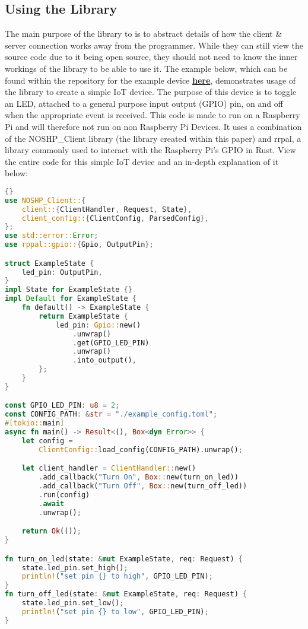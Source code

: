 \subsection{Using the Library}
The main purpose of the library to is to abstract details of how the client \& server connection works away from the programmer. While they can still view the source code due to it being open source, they should not need to know the inner workings of the library to be able to use it. The example below, which can be found within the repository for the example device \textbf{\href{https://github.com/niknik3610/Example-Iot-Device}{here}}, demonstrates usage of the library to create a simple IoT device. The purpose of this device is to toggle an LED, attached to a general purpose input output (GPIO) pin, on and off when the appropriate event is received. This code is made to run on a Raspberry Pi and will therefore not run on non Raspberry Pi Devices. It uses a combination of the NOSHP\_Client library (the library created within this paper) and rrpal, a library commonly used to interact with the Raspberry Pi's GPIO in Rust. View the entire code for this simple IoT device and an in-depth explanation of it below: 

\begin{lstlisting}[language=Rust, style=boxed, showstringspaces=false]{}
use NOSHP_Client::{
    client::{ClientHandler, Request, State},
    client_config::{ClientConfig, ParsedConfig},
};
use std::error::Error;
use rppal::gpio::{Gpio, OutputPin};

struct ExampleState {
    led_pin: OutputPin,
}
impl State for ExampleState {}
impl Default for ExampleState {
    fn default() -> ExampleState {
        return ExampleState {
            led_pin: Gpio::new()
                .unwrap()
                .get(GPIO_LED_PIN)
                .unwrap()
                .into_output(),
        };
    }
}

const GPIO_LED_PIN: u8 = 2;
const CONFIG_PATH: &str = "./example_config.toml";
#[tokio::main]
async fn main() -> Result<(), Box<dyn Error>> {
    let config = 
        ClientConfig::load_config(CONFIG_PATH).unwrap();

    let client_handler = ClientHandler::new()
        .add_callback("Turn On", Box::new(turn_on_led))
        .add_callback("Turn Off", Box::new(turn_off_led))
        .run(config)
        .await
        .unwrap();

    return Ok(());
}

fn turn_on_led(state: &mut ExampleState, req: Request) {
    state.led_pin.set_high();
    println!("set pin {} to high", GPIO_LED_PIN);
}
fn turn_off_led(state: &mut ExampleState, req: Request) {
    state.led_pin.set_low();
    println!("set pin {} to low", GPIO_LED_PIN);
}
\end{lstlisting}


